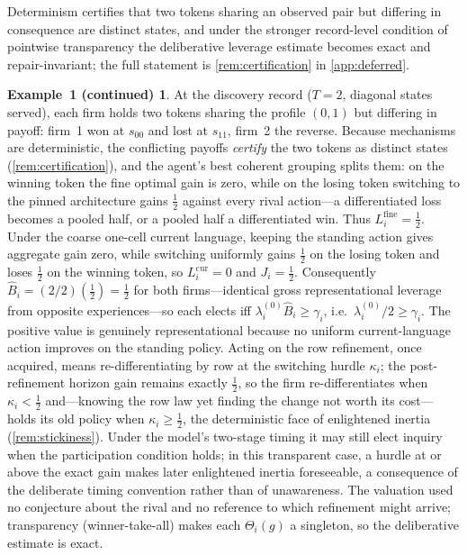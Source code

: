 \documentclass[11pt]{article}
\theoremstyle{definition}
\newtheorem*{excont}{Example~1 (continued)}
\begin{document}
Determinism certifies that two tokens sharing an observed pair but differing in consequence are distinct states, and under the stronger record-level condition of pointwise transparency the deliberative leverage estimate becomes exact and repair-invariant; the full statement is \cref{rem:certification} in \cref{app:deferred}.

\begin{excont}
At the discovery record ($T=2$, diagonal states served), each firm holds two tokens sharing the profile $(0,1)$ but differing in payoff: firm~1 won at $s_{00}$ and lost at $s_{11}$, firm~2 the reverse.
Because mechanisms are deterministic, the conflicting payoffs \emph{certify} the two tokens as distinct states (\cref{rem:certification}), and the agent's best coherent grouping splits them: on the winning token the fine optimal gain is zero, while on the losing token switching to the pinned architecture gains $\tfrac12$ against every rival action---a differentiated loss becomes a pooled half, or a pooled half a differentiated win.
Thus $L_i^{\mathrm{fine}}=\tfrac12$.
Under the coarse one-cell current language, keeping the standing action gives aggregate gain zero, while switching uniformly gains $\tfrac12$ on the losing token and loses $\tfrac12$ on the winning token, so $L_i^{\mathrm{cur}}=0$ and $J_i=\tfrac12$.
Consequently $\widehat B_i=(2/2)(\tfrac12)=\tfrac12$ for both firms---identical gross representational leverage from opposite experiences---so each elects iff $\lambda_i^{(0)}\widehat B_i\geq\gamma_i$, i.e.\ $\lambda_i^{(0)}/2\geq\gamma_i$.
The positive value is genuinely representational because no uniform current-language action improves on the standing policy.
Acting on the row refinement, once acquired, means re-differentiating by row at the switching hurdle $\kappa_i$; the post-refinement horizon gain remains exactly $\tfrac12$, so the firm re-differentiates when $\kappa_i<\tfrac12$ and---knowing the row law yet finding the change not worth its cost---holds its old policy when $\kappa_i\geq\tfrac12$, the deterministic face of enlightened inertia (\cref{rem:stickiness}).
Under the model's two-stage timing it may still elect inquiry when the participation condition holds; in this transparent case, a hurdle at or above the exact gain makes later enlightened inertia foreseeable, a consequence of the deliberate timing convention rather than of unawareness.
The valuation used no conjecture about the rival and no reference to which refinement might arrive; transparency (winner-take-all) makes each $\Theta_i(g)$ a singleton, so the deliberative estimate is exact.

\end{excont}
\end{document}
